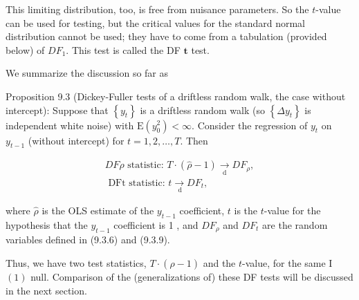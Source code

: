\documentclass[10pt]{article}
\begin{document}
This limiting distribution, too, is free from nuisance parameters. So the $t$-value can be used for testing, but the critical values for the standard normal distribution cannot be used; they have to come from a tabulation (provided below) of $D F_{1}$. This test is called the DF $\boldsymbol{t}$ test.

We summarize the discussion so far as

Proposition 9.3 (Dickey-Fuller tests of a driftless random walk, the case without intercept): Suppose that $\left\{y_{t}\right\}$ is a driftless random walk (so $\left\{\Delta y_{t}\right\}$ is independent white noise) with $\mathrm{E}\left(y_{0}^{2}\right)<\infty$. Consider the regression of $y_{t}$ on $y_{t-1}$ (without intercept) for $t=1,2, \ldots, T$. Then

$$
\begin{gathered}
D F \rho \text { statistic: } T \cdot(\hat{\rho}-1) \underset{\mathrm{d}}{\rightarrow} D F_{\rho}, \\
\text { DFt statistic: } t \underset{\mathrm{~d}}{\rightarrow} D F_{t},
\end{gathered}
$$

where $\hat{\rho}$ is the OLS estimate of the $y_{t-1}$ coefficient, $t$ is the $t$-value for the hypothesis that the $y_{t-1}$ coefficient is 1 , and $D F_{\rho}$ and $D F_{t}$ are the random variables defined in (9.3.6) and (9.3.9).

Thus, we have two test statistics, $T \cdot(\hat{\rho}-1)$ and the $t$-value, for the same I $(1)$ null. Comparison of the (generalizations of) these DF tests will be discussed in the next section.
\end{document}

